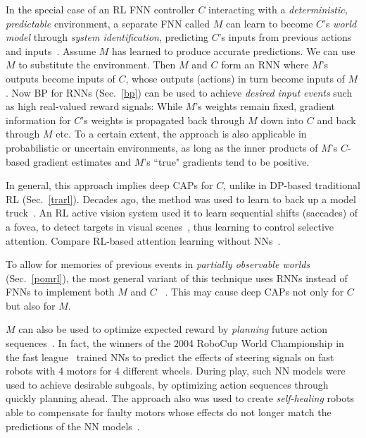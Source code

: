 \documentclass[letterpaper]{article}
\begin{document}
\begin{CJK*}{UTF8}{gbsn}
In the special case of an RL FNN controller 
$C$ interacting with a 
{\em deterministic, predictable} environment, 
a separate FNN called $M$ 
can learn to become $C$'s {\em world model} through {\em system identification},
predicting $C$'s inputs from previous actions and inputs~\citep[e.g.,][]{Werbos:81sensitivity,Werbos:87,Munro:87,Jordan:88,Werbos:89identification,Werbos:89neurocontrol,RobinsonFallside:89,JordanRumelhart:90,Schmidhuber:90sandiego,narendra1990,Werbos:92sticky,kawato1993,cochocki1993,levin1995,miller1995,ljung1998,prokhorov2001,ge2010}.
Assume $M$ has learned to produce accurate predictions.
We can use $M$ to substitute the environment.
Then $M$ and $C$ form an RNN where $M$'s outputs become inputs of $C$, 
whose outputs (actions) in turn become inputs of $M$.
Now BP  for RNNs (Sec.~\ref{bp}) can be used 
to achieve {\em desired input events}  such as high real-valued reward signals:
While $M$'s weights remain fixed,
gradient information for $C$'s weights is propagated
back through $M$ down into $C$ and
back through $M$ etc. 
To a certain extent, the approach is also applicable in probabilistic or uncertain environments, as long as the inner products of $M$'s $C$-based gradient estimates and $M$'s ``true" gradients tend to be positive. 

In general, this approach
 implies deep CAPs for $C$, unlike in DP-based traditional  RL (Sec.~\ref{trarl}).
Decades ago, the method was used to
 learn to back up a model truck~\citep{NguyenWidrow:89}.
An RL active vision system used it to learn sequential shifts (saccades) of a fovea, to
detect targets in visual scenes~\citep{SchmidhuberHuber:91},
thus learning to control selective attention.
Compare RL-based attention learning without NNs~\citep{Whitehead:92}.


To allow for memories of previous events in
{\em partially observable worlds}
 (Sec.~\ref{pomrl}),
the most general variant of this technique uses 
RNNs instead of FNNs to implement both $M$ and $C$ ~\citep{Schmidhuber:90sandiego,Schmidhuber:91nips,feldkamp1998}.
This may cause deep CAPs not only for $C$ but also for $M$.

$M$ can also be used to optimize expected reward by {\em planning} future action sequences~\citep{Schmidhuber:90sandiego}.
In fact, the winners of the 2004 RoboCup World Championship in the fast league~\citep{egorova03}
trained NNs to predict the effects of steering signals on fast
robots with 4 motors for 4 different wheels. During play, such NN models were used 
to achieve desirable subgoals, 
by optimizing action sequences through quickly planning ahead. The approach also
was used to create {\em self-healing} robots able to compensate for faulty motors whose effects do not longer 
match the predictions of the NN models~\citep{gloye05,schmidhuber2007pro}. 


\end{CJK*}
\end{document}
